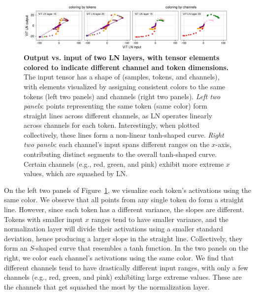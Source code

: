 \begin{figure}[t]
\centering
\vspace{12ex}
\includegraphics[width=0.98\textwidth]{figures/inout_color.png}
\vspace{2pt}
\caption{\textbf{Output vs. input of two LN layers, with tensor elements colored to indicate different channel and token dimensions.} The input tensor has a shape of (samples, tokens, and channels), with elements visualized by assigning consistent colors to the same tokens (left two panels) and channels (right two panels). \emph{Left two panels}: points representing the same token (same color) form straight lines across different channels, as LN operates linearly across channels for each token. Interestingly, when plotted collectively, these lines form a non-linear tanh-shaped curve. 
\emph{Right two panels}: each channel's input spans different ranges on the $x$-axis, contributing distinct segments to the overall tanh-shaped curve. Certain channels (e.g., red, green, and pink) exhibit more extreme $x$ values, which are squashed by LN.}
\label{figure:input-output-color}
\end{figure}

\vskip 0.2cm
On the left two panels of Figure~\ref{figure:input-output-color}, we visualize each token's activations using the same color. We observe that all points from any single token do form a straight line. However, since each token has a different variance, the slopes are different. Tokens with smaller input $x$ ranges tend to have smaller variance, and the normalization layer will divide their activations using a smaller standard deviation, hence producing a larger slope in the straight line. Collectively, they form an $S$-shaped curve that resembles a tanh function.
In the two panels on the right, we color each channel's activations using the same color. We find that different channels tend to have drastically different input ranges, with only a few channels (e.g., red, green, and pink) exhibiting large extreme values. These are the channels that get squashed the most by the normalization layer.

